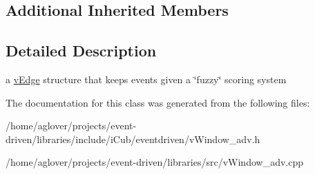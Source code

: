 \subsection*{Additional Inherited Members}


\subsection{Detailed Description}
a \hyperlink{classev_1_1vEdge}{v\+Edge} structure that keeps events given a \char`\"{}fuzzy\char`\"{} scoring system 

The documentation for this class was generated from the following files\+:\begin{DoxyCompactItemize}
\item 
/home/aglover/projects/event-\/driven/libraries/include/i\+Cub/eventdriven/v\+Window\+\_\+adv.\+h\item 
/home/aglover/projects/event-\/driven/libraries/src/v\+Window\+\_\+adv.\+cpp\end{DoxyCompactItemize}
